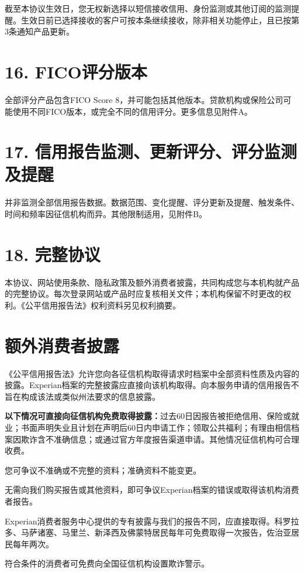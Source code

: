 \documentclass[UTF8,fontset=none,11pt,a4paper]{ctexart}
\begin{document}
截至本协议生效日，您无权新选择以短信接收信用、身份监测或其他订阅的监测提醒。生效日前已选择接收的客户可按本条继续接收，除非相关功能停止，且已按第3条通知\allowbreak\mbox{产品更新。}


\section*{16. FICO评分版本}
全部评分产品包含FICO Score 8，并可能包括其他版本。贷款机构或保险公司可能使用不同FICO版本，或完全不同的信用评分。更多信息见附件A。


\section*{17. 信用报告监测、更新评分、评分监测及提醒}
并非监测全部信用报告数据。数据范围、变化提醒、评分更新及提醒、触发条件、时间和频率因征信机构而异。其他限制适用，见附件B。


\section*{18. 完整协议}
本协议、网站使用条款、隐私政策及额外消费者披露，共同构成您与本机构就产品的完整协议。每次登录网站或产品时应复核相关文件；本机构保留不时更改的权利。《公平信用报告法》权利资料另见\allowbreak\mbox{权利摘要。}


\section*{额外消费者披露}
《公平信用报告法》允许您向各征信机构取得请求时档案中全部资料性质及内容的披露。Experian档案的完整披露应直接向该机构取得。向本服务申请的信用报告不旨在构成该法或类似州法要求的\allowbreak\mbox{信息披露。}


\textbf{以下情况可直接向征信机构免费取得披露：}过去60日因报告被拒绝信用、保险或就业；书面声明失业且计划在声明后60日内申请工作；领取公共福利；有理由相信档案因欺诈含不准确信息；或通过官方年度报告渠道申请。其他情况征信机构可\allowbreak\mbox{合理收费。}


您可争议不准确或不完整的资料；准确资料\allowbreak\mbox{不能变更。}


无需向我们购买报告或其他资料，即可争议Experian档案的错误或取得该机构消\allowbreak\mbox{费者报告。}


Experian消费者服务中心提供的专有披露与我们的报告不同，应直接取得。科罗拉多、马萨诸塞、马里兰、新泽西及佛蒙特居民每年可免费取得一次报告，佐治亚居民\allowbreak\mbox{每年两次。}


符合条件的消费者可免费向全国征信机构设置\allowbreak\mbox{欺诈警示。}
\end{document}
